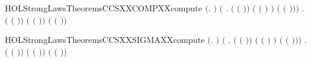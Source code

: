 \begin{SaveVerbatim}{HOLStrongLawsTheoremsCCSXXCOMPXXcompute}
\HOLTokenTurnstile{} \ensuremath{(}\HOLSymConst{\HOLTokenForall{}}.    \HOLSymConst{\ensuremath{=}}  \ensuremath{)} \HOLSymConst{\HOLTokenConj{}}
   \ensuremath{(}\HOLSymConst{\HOLTokenForall{}} .
          \ensuremath{(} \ensuremath{(} \ensuremath{)}\ensuremath{)} \HOLSymConst{\ensuremath{=}}
          \ensuremath{(} \ensuremath{(} \ensuremath{)} \HOLSymConst{\ensuremath{-}} \ensuremath{)} \HOLSymConst{\ensuremath{\mid}}  \ensuremath{(} \ensuremath{(} \ensuremath{)}\ensuremath{)}\ensuremath{)} \HOLSymConst{\HOLTokenConj{}}
   \HOLSymConst{\HOLTokenForall{}} .
         \ensuremath{(} \ensuremath{(} \ensuremath{)}\ensuremath{)} \HOLSymConst{\ensuremath{=}}
         \ensuremath{(} \ensuremath{(} \ensuremath{)}\ensuremath{)} \HOLSymConst{\ensuremath{\mid}}  \ensuremath{(} \ensuremath{(} \ensuremath{)}\ensuremath{)}
\end{SaveVerbatim}
\newcommand{\HOLStrongLawsTheoremsCCSXXCOMPXXcompute}{\UseVerbatim{HOLStrongLawsTheoremsCCSXXCOMPXXcompute}}
\begin{SaveVerbatim}{HOLStrongLawsTheoremsCCSXXSIGMAXXcompute}
\HOLTokenTurnstile{} \ensuremath{(}\HOLSymConst{\HOLTokenForall{}}.    \HOLSymConst{\ensuremath{=}}  \ensuremath{)} \HOLSymConst{\HOLTokenConj{}}
   \ensuremath{(}\HOLSymConst{\HOLTokenForall{}} .
          \ensuremath{(} \ensuremath{(} \ensuremath{)}\ensuremath{)} \HOLSymConst{\ensuremath{=}}
          \ensuremath{(} \ensuremath{(} \ensuremath{)} \HOLSymConst{\ensuremath{-}} \ensuremath{)} \HOLSymConst{\ensuremath{+}}  \ensuremath{(} \ensuremath{(} \ensuremath{)}\ensuremath{)}\ensuremath{)} \HOLSymConst{\HOLTokenConj{}}
   \HOLSymConst{\HOLTokenForall{}} .
         \ensuremath{(} \ensuremath{(} \ensuremath{)}\ensuremath{)} \HOLSymConst{\ensuremath{=}}
         \ensuremath{(} \ensuremath{(} \ensuremath{)}\ensuremath{)} \HOLSymConst{\ensuremath{+}}  \ensuremath{(} \ensuremath{(} \ensuremath{)}\ensuremath{)}
\end{SaveVerbatim}
